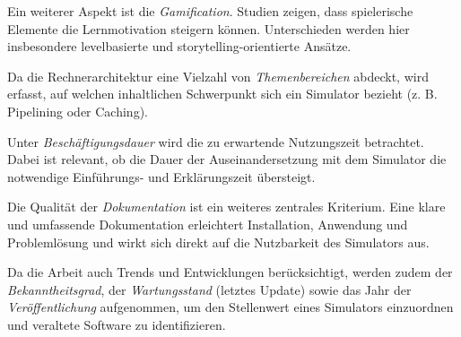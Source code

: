 Ein weiterer Aspekt ist die \textit{Gamification}. Studien zeigen, dass spielerische Elemente die Lernmotivation steigern können. Unterschieden werden hier insbesondere levelbasierte und storytelling-orientierte Ansätze.\parencite[S. 106f]{sailer_gamification_2020}\parencite[S. 13]{baah_enhancing_2024}

Da die Rechnerarchitektur eine Vielzahl von \textit{Themenbereichen} abdeckt, wird erfasst, auf welchen inhaltlichen Schwerpunkt sich ein Simulator bezieht (z. B. Pipelining oder Caching).

Unter \textit{Beschäftigungsdauer} wird die zu erwartende Nutzungszeit betrachtet. Dabei ist relevant, ob die Dauer der Auseinandersetzung mit dem Simulator die notwendige Einführungs- und Erklärungszeit übersteigt.

Die Qualität der \textit{Dokumentation} ist ein weiteres zentrales Kriterium. Eine klare und umfassende Dokumentation erleichtert Installation, Anwendung und Problemlösung und wirkt sich direkt auf die Nutzbarkeit des Simulators aus.

Da die Arbeit auch Trends und Entwicklungen berücksichtigt, werden zudem der \textit{Bekanntheitsgrad}, der \textit{Wartungsstand} (letztes Update) sowie das Jahr der \textit{Veröffentlichung} aufgenommen, um den Stellenwert eines Simulators einzuordnen und veraltete Software zu identifizieren.

